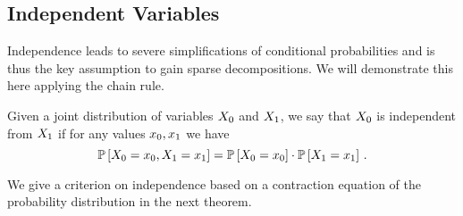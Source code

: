 \subsection{Independent Variables}

Independence leads to severe simplifications of conditional probabilities and is thus the key assumption to gain sparse decompositions.
We will demonstrate this here applying the chain rule.

\begin{definition}[Independence]\label{def:independence}
	Given a joint distribution of variables $X_{0}$ and $X_{1}$, we say that $X_{0}$ is independent from $X_{1}$ if for any values $x_{0},x_{1}$ we have
		\[ \mathbb{P}\left[X_{0}=x_{0},X_{1}=x_{1}\right] 
		= \mathbb{P}\left[X_{0}=x_{0}\right]
		 \cdot 
		 \mathbb{P}\left[X_{1}=x_{1}\right] \, . \]
\end{definition}

We give a criterion on independence based on a contraction equation of the probability distribution in the next theorem.

